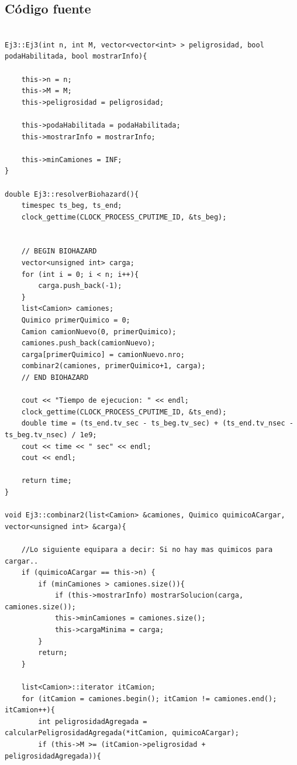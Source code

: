 \subsection{C\'odigo fuente}

\begin{lstlisting}

Ej3::Ej3(int n, int M, vector<vector<int> > peligrosidad, bool podaHabilitada, bool mostrarInfo){

	this->n = n;
	this->M = M;
	this->peligrosidad = peligrosidad;

	this->podaHabilitada = podaHabilitada;
	this->mostrarInfo = mostrarInfo;

	this->minCamiones = INF;
}

double Ej3::resolverBiohazard(){
	timespec ts_beg, ts_end;
	clock_gettime(CLOCK_PROCESS_CPUTIME_ID, &ts_beg);


	// BEGIN BIOHAZARD
	vector<unsigned int> carga;
	for (int i = 0; i < n; i++){
		carga.push_back(-1);
	} 
	list<Camion> camiones;
	Quimico primerQuimico = 0;
	Camion camionNuevo(0, primerQuimico);
	camiones.push_back(camionNuevo);
	carga[primerQuimico] = camionNuevo.nro;
	combinar2(camiones, primerQuimico+1, carga);
	// END BIOHAZARD

	cout << "Tiempo de ejecucion: " << endl;
	clock_gettime(CLOCK_PROCESS_CPUTIME_ID, &ts_end);
	double time = (ts_end.tv_sec - ts_beg.tv_sec) + (ts_end.tv_nsec - ts_beg.tv_nsec) / 1e9;
	cout << time << " sec" << endl;
	cout << endl;

	return time;
}

void Ej3::combinar2(list<Camion> &camiones, Quimico quimicoACargar, vector<unsigned int> &carga){

	//Lo siguiente equipara a decir: Si no hay mas quimicos para cargar..
	if (quimicoACargar == this->n) {
		if (minCamiones > camiones.size()){
			if (this->mostrarInfo) mostrarSolucion(carga, camiones.size());
			this->minCamiones = camiones.size();
			this->cargaMinima = carga;	
		}
		return;
	}

	list<Camion>::iterator itCamion;
	for (itCamion = camiones.begin(); itCamion != camiones.end(); itCamion++){
		int peligrosidadAgregada = calcularPeligrosidadAgregada(*itCamion, quimicoACargar);
		if (this->M >= (itCamion->peligrosidad + peligrosidadAgregada)){


\end{lstlisting}
